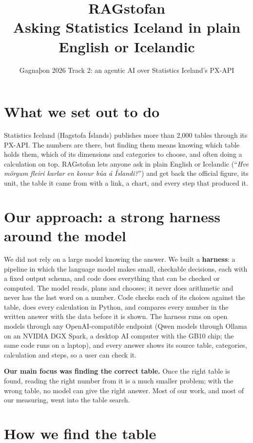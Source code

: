 \documentclass[10pt,a4paper]{article}
\title{\vspace{-1.6em}\textbf{RAGstofan}\\[0.2em]\large Asking Statistics Iceland in plain English or Icelandic}
\author{Gagnaþon 2026 \textperiodcentered{} Track 2: an agentic AI over Statistics Iceland's PX-API}
\date{\vspace{-1.2em}}
\begin{document}
\maketitle
\vspace{-0.8em}

\section*{What we set out to do}

Statistics Iceland (Hagstofa Íslands) publishes more than 2,000 tables through its PX-API. The numbers are there, but finding
them means knowing which table holds them, which of its dimensions and categories to choose, and often doing a
calculation on top. RAGstofan lets anyone ask in plain English or Icelandic (``\emph{Hve mörgum fleiri karlar en
konur búa á Íslandi?}'') and get back the official figure, its unit, the table it came from with a link, a chart,
and every step that produced it.

\section*{Our approach: a strong harness around the model}

We did not rely on a large model knowing the answer. We built a \textbf{harness}: a pipeline in which the language
model makes small, checkable decisions, each with a fixed output schema, and code does everything that can be
checked or computed. The model reads, plans and chooses; it never does arithmetic and never has the last word on a
number. Code checks each of its choices against the table, does every calculation in Python, and compares every
number in the written answer with the data before it is shown. The harness runs on open models through any
OpenAI-compatible endpoint (Qwen models through Ollama on an NVIDIA DGX Spark, a desktop AI computer with the GB10 chip; the same code runs on a
laptop), and every answer shows its source table, categories, calculation and steps, so a user can check it.

\textbf{Our main focus was finding the correct table.} Once the right table is found, reading the right number from
it is a much smaller problem; with the wrong table, no model can give the right answer. Most of our work, and most of
our measuring, went into the table search.

\section*{How we find the table}
\end{document}
